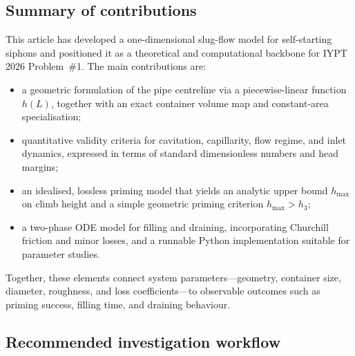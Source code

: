 \documentclass[11pt]{article}
\begin{document}
\subsection{Summary of contributions}

This article has developed a one-dimensional slug-flow model for self-starting siphons and
positioned it as a theoretical and computational backbone for IYPT 2026 Problem~\#1. The main
contributions are:
\begin{itemize}
  \item a geometric formulation of the pipe centreline via a piecewise-linear function $h(L)$,
        together with an exact container volume map and constant-area specialisation;
  \item quantitative validity criteria for cavitation, capillarity, flow regime, and inlet
        dynamics, expressed in terms of standard dimensionless numbers and head margins;
  \item an idealised, lossless priming model that yields an analytic upper bound $h_{\max}$ on
        climb height and a simple geometric priming criterion $h_{\max}>h_3$;
  \item a two-phase ODE model for filling and draining, incorporating Churchill friction and
        minor losses, and a runnable Python implementation suitable for parameter studies.
\end{itemize}
Together, these elements connect system parameters---geometry, container size, diameter,
roughness, and loss coefficients---to observable outcomes such as priming success, filling
time, and draining behaviour.

\subsection{Recommended investigation workflow}
\end{document}
